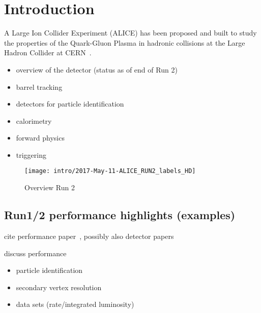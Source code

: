 \section{Introduction}

A Large Ion Collider Experiment (ALICE) has been proposed and built to study
the properties of the Quark-Gluon Plasma in hadronic collisions at the Large
Hadron Collider at CERN~\cite{Aamodt:2008zz}.

\begin{itemize}
\item overview of the detector
  (status as of end of Run 2)
\item barrel tracking
\item detectors for particle identification
\item calorimetry
\item forward physics
\item triggering
\end{itemize}

\begin{figure}
\centering
\texttt{[image: intro/2017-May-11-ALICE\_RUN2\_labels\_HD]}
\caption{Overview Run 2}
\label{fig:alice_run2}
\end{figure}

\subsection{Run1/2 performance highlights (examples)}

cite performance paper~\cite{Abelev:2014ffa}, possibly also detector papers

discuss performance
\begin{itemize}
\item particle identification
\item secondary vertex resolution
\item data sets (rate/integrated luminosity)
\end{itemize}
